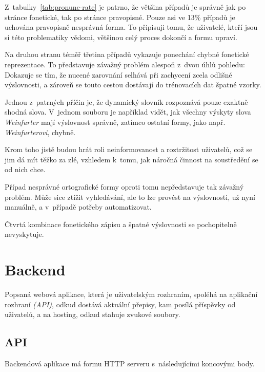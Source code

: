 Z~tabulky~\ref{tab:pronunc-rate} je patrno, že většina případů je správně jak
po stránce fonetické, tak po stránce pravopisné. Pouze asi ve 13\% případů je
uchována pravopisně nesprávná forma. To připisuji tomu, že uživatelé, kteří jsou
si této problematiky vědomi, většinou celý proces dokončí a formu upraví.

Na druhou stranu téměř třetina případů vykazuje ponechání chybné fonetické
reprezentace. To představuje závažný problém alespoň z~dvou úhlů pohledu:
Dokazuje se tím, že nucené zarovnání selhává při zachycení zcela odlišné
výslovnosti, a zároveň se touto cestou dostávají do trénovacích dat špatné
vzorky.

Jednou z~patrných příčin je, že dynamický slovník rozpoznává pouze exaktně
shodná slova. V~jednom souboru je například vidět, jak všechny výskyty slova
{\em Weinfurter} mají výslovnost správně, zatímco ostatní formy, jako např. {\em
Weinfurterovi}, chybně.

Krom toho jistě budou hrát roli neinformovanost a roztržitost uživatelů, což se
jim dá mít těžko za zlé, vzhledem k~tomu, jak náročná činnost na soustředění se
od nich chce.

Případ nesprávné ortografické formy oproti tomu nepředstavuje tak závažný
problém. Může sice ztížit vyhledávání, ale to lze provést na výslovnosti,
už nyní manuálně, a v~případě potřeby automatizovat.

Čtvrtá kombinace fonetického zápisu a špatné výslovnosti se pochopitelně
nevyskytuje.

\normalfont 

\section{Backend}

Popsaná webová aplikace, která je uživatelským rozhraním, spoléhá na aplikační
rozhraní {\em (API)}, odkud dostává aktuální přepisy, kam posílá příspěvky od
uživatelů, a na hosting, odkud stahuje zvukové soubory.

\subsection{API}

Backendová aplikace má formu HTTP serveru s~následujícími koncovými body.

